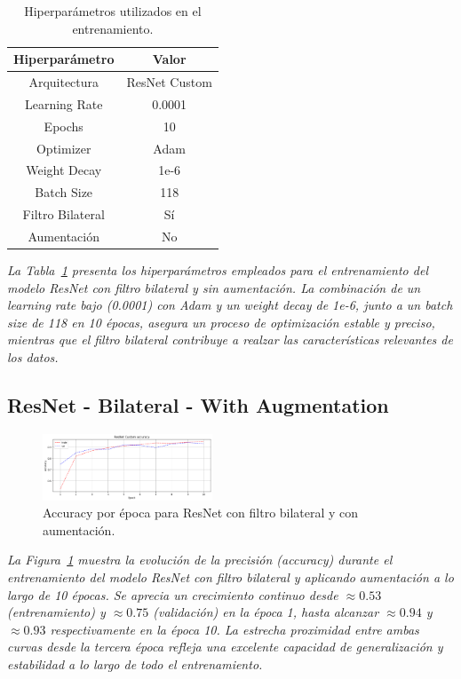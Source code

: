 \documentclass[conference]{IEEEtran}
\begin{document}
\begin{table}[H]
    \centering
    \begin{tabular}{|c|c|}
        \hline
        \textbf{Hiperparámetro} & \textbf{Valor} \\
        \hline
        Arquitectura       & ResNet Custom \\
        Learning Rate      & 0.0001        \\
        Epochs             & 10            \\
        Optimizer          & Adam          \\
        Weight Decay       & 1e-6          \\
        Batch Size         & 118           \\
        Filtro Bilateral   & Sí            \\
        Aumentación        & No            \\
        \hline
    \end{tabular}
    \caption{Hiperparámetros utilizados en el entrenamiento.}
    \label{tab:resnet_bilateral_without_hparams}
\end{table}
\noindent\textit{%
La Tabla~\ref{tab:resnet_bilateral_without_hparams} presenta los hiperparámetros empleados para el entrenamiento del modelo ResNet con filtro bilateral y sin aumentación. La combinación de un learning rate bajo (0.0001) con Adam y un weight decay de 1e-6, junto a un batch size de 118 en 10 épocas, asegura un proceso de optimización estable y preciso, mientras que el filtro bilateral contribuye a realzar las características relevantes de los datos.%
}

\subsection{ResNet - Bilateral - With Augmentation}

\begin{figure}[H]
    \centering
    \includegraphics[width=0.45\textwidth]{graphics-resnet-bilateral/resnet_bilateral_with_accuracy.png}
    \caption{Accuracy por época para ResNet con filtro bilateral y con aumentación.}
    \label{fig:resnet_bilateral_with_accuracy}
\end{figure}
\noindent\textit{%
La Figura~\ref{fig:resnet_bilateral_with_accuracy} muestra la evolución de la precisión (accuracy) durante el entrenamiento del modelo ResNet con filtro bilateral y aplicando aumentación a lo largo de 10 épocas. Se aprecia un crecimiento continuo desde \(\approx0.53\) (entrenamiento) y \(\approx0.75\) (validación) en la época 1, hasta alcanzar \(\approx0.94\) y \(\approx0.93\) respectivamente en la época 10. La estrecha proximidad entre ambas curvas desde la tercera época refleja una excelente capacidad de generalización y estabilidad a lo largo de todo el entrenamiento.%
}
\end{document}
